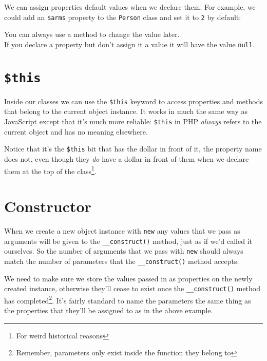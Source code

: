 We can assign properties default values when we declare them. For example, we could add an \texttt{\$arms} property to the \texttt{Person} class and set it to \texttt{2} by default:


You can always use a method to change the value later.
\\

If you declare a property but don't assign it a value it will have the value \texttt{null}.


\section{\texttt{\$this}}

Inside our classes we can use the \texttt{\$this} keyword to access properties and methods that belong to the current object instance. It works in much the same way as JavaScript except that it's much more reliable: \texttt{\$this} in PHP \textit{always} refers to the current object and has no meaning elsewhere.


Notice that it's the \texttt{\$this} bit that has the dollar in front of it, the property name does not, even though they \textit{do} have a dollar in front of them when we declare them at the top of the class\footnote{For weird historical reasons}.

\section{Constructor}

When we create a new object instance with \texttt{new} any values that we pass as arguments will be given to the \texttt{\_\_construct()} method, just as if we'd called it ourselves. So the number of arguments that we pass with \texttt{new} should always match the number of parameters that the \texttt{\_\_construct()} method accepts:


We need to make sure we store the values passed in as properties on the newly created instance, otherwise they'll cease to exist once the \texttt{\_\_construct()} method has completed\footnote{Remember, parameters only exist inside the function they belong to}. It's fairly standard to name the parameters the same thing as the properties that they'll be assigned to as in the above example.
\\

